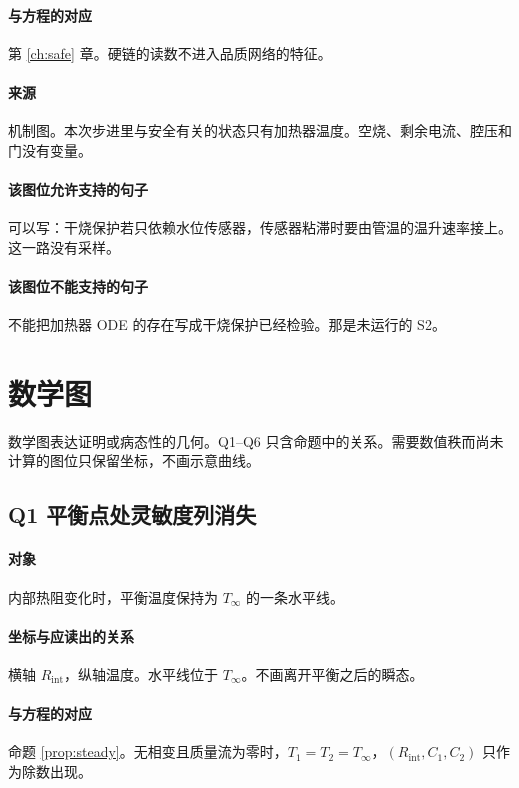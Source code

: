 \paragraph{与方程的对应}
第 \ref{ch:safe} 章。硬链的读数不进入品质网络的特征。

\paragraph{来源}
机制图。本次步进里与安全有关的状态只有加热器温度。空烧、剩余电流、腔压和门没有变量。

\paragraph{该图位允许支持的句子}
可以写：干烧保护若只依赖水位传感器，传感器粘滞时要由管温的温升速率接上。这一路没有采样。

\paragraph{该图位不能支持的句子}
不能把加热器 ODE 的存在写成干烧保护已经检验。那是未运行的 S2。

\section{数学图}

数学图表达证明或病态性的几何。Q1--Q6 只含命题中的关系。需要数值秩而尚未计算的图位只保留坐标，不画示意曲线。

\subsection{Q1 平衡点处灵敏度列消失}
\paragraph{对象}
内部热阻变化时，平衡温度保持为 $T_\infty$ 的一条水平线。

\paragraph{坐标与应读出的关系}
横轴 $R_{\mathrm{int}}$，纵轴温度。水平线位于 $T_\infty$。不画离开平衡之后的瞬态。

\paragraph{与方程的对应}
命题 \ref{prop:steady}。无相变且质量流为零时，$T_1=T_2=T_\infty$，$(R_{\mathrm{int}},C_1,C_2)$ 只作为除数出现。

